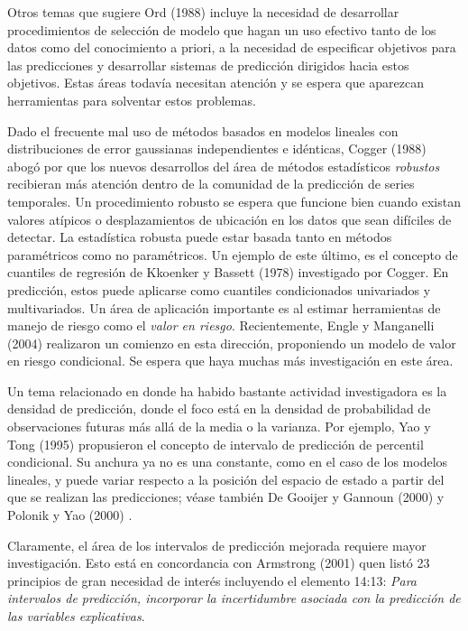 \documentclass{llncs}
\begin{document}
Otros temas que sugiere Ord (1988) \cite{Ord1988389} incluye la necesidad de desarrollar procedimientos de selección de modelo que hagan un uso efectivo tanto de los datos como del conocimiento a priori, a la necesidad de especificar objetivos para las predicciones y desarrollar sistemas de predicción dirigidos hacia estos objetivos. Estas áreas todavía necesitan atención y se espera que aparezcan herramientas para solventar estos problemas.

Dado el frecuente mal uso de métodos basados en modelos lineales con distribuciones de error gaussianas independientes e idénticas, Cogger (1988) \cite{Cogger1988403} abogó por que los nuevos desarrollos del área de métodos estadísticos \emph{robustos} recibieran más atención dentro de la comunidad de la predicción de series temporales. Un procedimiento robusto se espera que funcione bien cuando existan valores atípicos o desplazamientos de ubicación en los datos que sean difíciles de detectar. La estadística robusta puede estar basada tanto en métodos paramétricos como no paramétricos. Un ejemplo de este último, es el concepto de cuantiles de regresión de Kkoenker y Bassett (1978) \cite{Koenker197833} investigado por Cogger. En predicción, estos puede aplicarse como cuantiles condicionados univariados y multivariados. Un área de aplicación importante es al estimar herramientas de manejo de riesgo como el \emph{valor en riesgo}. Recientemente, Engle y Manganelli (2004) \cite{Engle2004367} realizaron un comienzo en esta dirección, proponiendo un modelo de valor en riesgo condicional. Se espera que haya muchas más investigación en este área.

Un tema relacionado en donde ha habido bastante actividad investigadora es la densidad de predicción, donde el foco está en la densidad de probabilidad de observaciones futuras más allá de la media o la varianza. Por ejemplo, Yao y Tong (1995) \cite{Yao1995395} propusieron el concepto de intervalo de predicción de percentil condicional. Su anchura ya no es una constante, como en el caso de los modelos lineales, y puede variar respecto a la posición del espacio de estado a partir del que se realizan las predicciones; véase también De Gooijer y Gannoun (2000) \cite{DeGooijer2004237} y Polonik y Yao (2000) \cite{Polonik2000509}.

Claramente, el área de los intervalos de predicción mejorada requiere mayor investigación. Esto está en concordancia con Armstrong (2001) \cite{Armstrong2001} quen listó 23 principios de gran necesidad de interés incluyendo el elemento 14:13: \emph{Para intervalos de predicción, incorporar la incertidumbre asociada con la predicción de las variables explicativas}.
\end{document}
